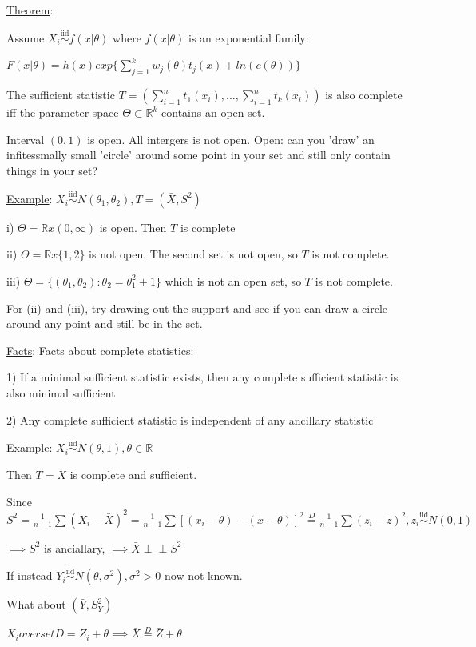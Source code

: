 \documentclass{article}
\newcommand{\indep}{\perp\!\!\!\!\perp} %
\newcommand{\real}{\mathbb{R}} %
\let\Oldsum=\sum
\renewcommand{\sum}{\Oldsum\limits}
\newcommand{\iiddist}{\overset{\mathrm{iid}}{\sim}}
\begin{document}
\underline{Theorem}:

Assume $X_i \iiddist f(x|\theta)$ where $f(x|\theta)$ is an exponential family:

$F(x|\theta) = h(x) exp\{\sum_{j=1}^k w_j(\theta)t_j(x) + ln(c(\theta)) \}$

The sufficient statistic $T = (\sum_{i=1}^n t_1(x_i), ..., \sum_{i=1}^n t_k(x_i))$ is also complete iff the parameter space $\Theta \subset \real^k$ contains an open set.

Interval $(0, 1)$ is open. All intergers is not open. Open: can you 'draw' an infitessmally small 'circle' around some point in your set and still only contain things in your set?

\underline{Example}: $X_i \iiddist N(\theta_1, \theta_2), T = (\bar{X}, S^2)$

i) $\Theta = \real x (0, \infty)$ is open. Then $T$ is complete

ii) $\Theta = \real x \{1, 2\}$ is not open. The second set is not open, so $T$ is not complete.

iii) $\Theta = \{(\theta_1, \theta_2): \theta_2 = \theta_1^2 + 1 \}$ which is not an open set, so $T$ is not complete.

For (ii) and (iii), try drawing out the support and see if you can draw a circle around any point and still be in the set. 

\underline{Facts}: Facts about complete statistics:

1) If a minimal sufficient statistic exists, then any complete sufficient statistic is also minimal sufficient

2) Any complete sufficient statistic is independent of any ancillary statistic

\underline{Example}: $X_i \iiddist N(\theta, 1), \theta \in \real$

Then $T = \bar{X}$ is complete and sufficient.

Since $S^2 = \frac{1}{n-1}\sum (X_i - \bar{X})^2 = \frac{1}{n-1} \sum [(x_i - \theta) - (\bar{x} - \theta)]^2 \overset{D}{=} \frac{1}{n-1} \sum (z_i - \bar{z})^2, z_i \iiddist N(0, 1)$

$\implies S^2$ is anciallary, $\implies \bar{X} \indep S^2$

If instead $Y_i \iiddist N(\theta, \sigma^2), \sigma^2 > 0$ now not known.

What about $(\bar{Y}, S_Y^2)$

$X_i overset{D}{=} Z_i + \theta \implies \bar{X} \overset{D}{=} \bar{Z} + \theta$
\end{document}
